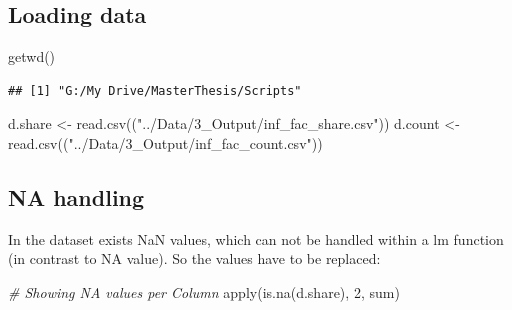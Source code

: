 \documentclass[
]{article}
\newenvironment{Shaded}{\begin{snugshade}}{\end{snugshade}}
\newcommand{\CommentTok}[1]{\textcolor[rgb]{0.56,0.35,0.01}{\textit{#1}}}
\newcommand{\DecValTok}[1]{\textcolor[rgb]{0.00,0.00,0.81}{#1}}
\newcommand{\FunctionTok}[1]{\textcolor[rgb]{0.00,0.00,0.00}{#1}}
\newcommand{\NormalTok}[1]{#1}
\newcommand{\OtherTok}[1]{\textcolor[rgb]{0.56,0.35,0.01}{#1}}
\newcommand{\StringTok}[1]{\textcolor[rgb]{0.31,0.60,0.02}{#1}}
\begin{document}
\hypertarget{loading-data}{%
\subsection{Loading data}\label{loading-data}}

\begin{Shaded}
\begin{Highlighting}[]
\FunctionTok{getwd}\NormalTok{()}
\end{Highlighting}
\end{Shaded}

\begin{verbatim}
## [1] "G:/My Drive/MasterThesis/Scripts"
\end{verbatim}

\begin{Shaded}
\begin{Highlighting}[]
\NormalTok{d.share }\OtherTok{\textless{}{-}} \FunctionTok{read.csv}\NormalTok{((}\StringTok{"../Data/3\_Output/inf\_fac\_share.csv"}\NormalTok{))}
\NormalTok{d.count }\OtherTok{\textless{}{-}} \FunctionTok{read.csv}\NormalTok{((}\StringTok{"../Data/3\_Output/inf\_fac\_count.csv"}\NormalTok{))}
\end{Highlighting}
\end{Shaded}

\hypertarget{na-handling}{%
\subsection{NA handling}\label{na-handling}}

In the dataset exists NaN values, which can not be handled within a lm
function (in contrast to NA value). So the values have to be replaced:

\begin{Shaded}
\begin{Highlighting}[]
\CommentTok{\# Showing NA values per Column}
\FunctionTok{apply}\NormalTok{(}\FunctionTok{is.na}\NormalTok{(d.share), }\DecValTok{2}\NormalTok{, sum)}
\end{Highlighting}
\end{Shaded}
\end{document}
